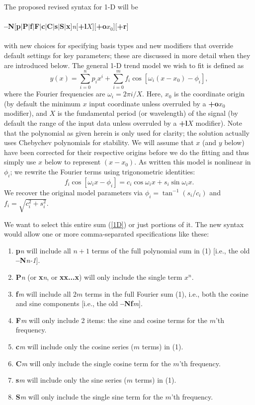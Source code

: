 \documentclass[12pt,letterpaper,margin=0.5in]{report}
\begin{document}
The proposed revised syntax for 1-D will be
\\ \\
{\bf --N}[{\bf p}$|${\bf P}$|${\bf f}$|${\bf F}$|${\bf c}$|${\bf C}$|${\bf s}$|${\bf S}$|${\bf x}]{\it n}[{\bf +l}$X$][{\bf +o}$x_0$][{\bf +r}]
\\ \\
with new choices for specifying basis types and new modifiers that override default settings for key parameters; these are discussed
in more detail when they are introduced below.
The general 1-D trend model we wish to fit is defined as
\begin{equation}
y(x) = \sum_{i = 0}^n p_i x^i + \sum_{i = 0}^m  f_i \cos \left [\omega_i (x-x_0) - \phi_i \right ],
\label{1D}
\end{equation}
where the Fourier frequencies are $\omega_i = 2 \pi i / X$.  Here, $x_0$ is the coordinate origin (by default the minimum $x$ input coordinate unless overruled by
a {\bf +o}$x_0$ modifier), and $X$ is the fundamental period (or wavelength) of the signal (by default the range of the input data unless overruled by a {\bf +l}$X$ modifier). Note that the polynomial as given herein is only used for clarity; the solution actually uses Chebychev polynomials for stability.
We will assume that $x$ (and $y$ below) have been corrected for their respective origins before we do the fitting and thus simply
use $x$ below to represent $(x-x_0)$.  As written this model is nonlinear in $\phi_i$; we rewrite the Fourier terms using trigonometric identities:
\begin{equation}
f_i \cos \left [\omega_i x - \phi_i \right ] =  c_i \cos \omega_i x  + s_i \sin \omega_i x .
\end{equation}
We recover the original model parameters via $\phi_i = \tan^{-1}(s_i/c_i)$ and $f_i = \sqrt{c_i^2 + s_i^2}$.
\par
We want to select this entire sum (\ref{1D}) or just portions of it.  The new syntax would allow one or more comma-separated specifications like these:
\begin{enumerate}
	\item {\bf p}{\it n} will include all $n+1$ terms of the full polynomial sum in (1) [i.e., the old {\bf --N}{\it n-1}].
	\item {\bf P}{\it n} (or {\bf x}{\it n}, or {\bf xx...x}) will only include the single term $x^n$.
	\item {\bf f}{\it m} will include all $2m$ terms in the full Fourier sum (1), i.e., both the cosine and sine components [i.e., the old {\bf --Nf}{\it m}].
	\item {\bf F}{\it m} will only include 2 items: the sine and cosine terms for the $m$'th frequency.
	\item {\bf c}{\it m} will include only the cosine series ($m$ terms) in (1).
	\item {\bf C}{\it m} will only include the single cosine term for the $m$'th frequency.
	\item {\bf s}{\it m} will include only the sine series ($m$ terms) in (1).
	\item {\bf S}{\it m} will only include the single sine term for the $m$'th frequency.
\end{enumerate}
\end{document}
